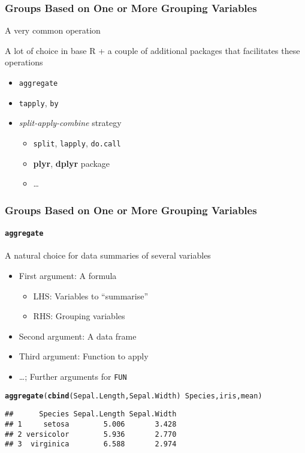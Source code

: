 \documentclass[paper=screen,mathserif]{beamer}\usepackage[]{graphicx}\usepackage[]{color}
\makeatletter
\newcommand{\hlopt}[1]{\textcolor[rgb]{0,0,0}{#1}}%
\newcommand{\hlstd}[1]{\textcolor[rgb]{0.345,0.345,0.345}{#1}}%
\newcommand{\hlkwd}[1]{\textcolor[rgb]{0.737,0.353,0.396}{\textbf{#1}}}%
\newenvironment{kframe}{%
 \def\at@end@of@kframe{}%
 \ifinner\ifhmode%
  \def\at@end@of@kframe{\end{minipage}}%
  \begin{minipage}{\columnwidth}%
 \fi\fi%
 \def\FrameCommand##1{\hskip\@totalleftmargin \hskip-\fboxsep
 \colorbox{shadecolor}{##1}\hskip-\fboxsep
     \hskip-\linewidth \hskip-\@totalleftmargin \hskip\columnwidth}%
 \MakeFramed {\advance\hsize-\width
   \@totalleftmargin\z@ \linewidth\hsize
   \@setminipage}}%
 {\par\unskip\endMakeFramed%
 \at@end@of@kframe}
\newenvironment{knitrout}{}{} %
\newcommand{\ft}[1]{\frametitle{#1}}
\newcommand{\fst}[1]{\framesubtitle{#1}}
\makeatother
\begin{document}
\begin{frame}[fragile]
  \ft{Groups Based on One or More Grouping Variables}
  
  A very common operation
  
  A lot of choice in base R + a couple of additional packages that
  facilitates these operations
  
  \begin{itemize}
  \item \verb=aggregate=
  \item \verb=tapply=, \verb=by=
  \item {\em split-apply-combine} strategy
    \begin{itemize}
    \item \verb=split=, \verb=lapply=, \verb=do.call=
    \item {\bf plyr}, {\bf dplyr} package
    \item \dots
    \end{itemize}

  \end{itemize}
\end{frame}

\begin{frame}[fragile]
  \ft{Groups Based on One or More Grouping Variables}
  \fst{{\tt aggregate}}
  
  A natural choice for data summaries of several variables
  \begin{itemize}
  \item First argument: A formula
    \begin{itemize}
    \item LHS: Variables to ``summarise''
    \item RHS: Grouping variables
    \end{itemize}
  \item Second argument: A data frame
  \item Third argument: Function to apply
  \item \dots; Further arguments for {\tt FUN} 
  \end{itemize}

\begin{knitrout}\scriptsize
{}\color{fgcolor}\begin{kframe}
\begin{alltt}
\hlkwd{aggregate}\hlstd{(}\hlkwd{cbind}\hlstd{(Sepal.Length, Sepal.Width)} \hlopt{~} \hlstd{Species, iris, mean)}
\end{alltt}
\begin{verbatim}
##      Species Sepal.Length Sepal.Width
## 1     setosa        5.006       3.428
## 2 versicolor        5.936       2.770
## 3  virginica        6.588       2.974
\end{verbatim}
\end{kframe}
\end{knitrout}
\end{frame}
\end{document}

